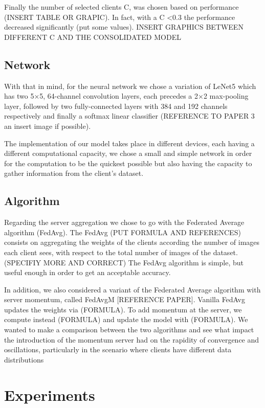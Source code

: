 \documentclass[twocolumn]{article}
\begin{document}
Finally the number of selected clients C, was chosen based on performance (INSERT TABLE OR GRAPIC). In fact, with a C <0.3 the performance decreased significantly (put some values).
INSERT GRAPHICS BETWEEN DIFFERENT C AND THE CONSOLIDATED MODEL

\subsection{Network}

With that in mind, for the neural network we chose a variation of LeNet5 which has two 5×5, 64-channel convolution layers, each precedes a 2×2 max-pooling layer, followed by two fully-connected layers with 384 and 192 channels respectively and finally a softmax linear classifier (REFERENCE TO PAPER 3 an insert image if possible). 

The implementation of our model takes place in different devices, each having a different computational capacity, we chose a small and simple network in order for the computation to be the quickest possible but also having the capacity to gather information from the client's dataset.

\subsection{Algorithm}
Regarding the server aggregation we chose to go with the Federated Average algorithm (FedAvg). The FedAvg (PUT FORMULA AND REFERENCES) consists on aggregating the weights of the clients according the number of images each client sees, with respect to the total number of images of the dataset.(SPECIFIY MORE AND CORRECT)
The FedAvg algorithm is simple, but useful enough in order to get an acceptable accuracy.

In addition, we also considered a variant of the Federated Average algorithm with server momentum, called FedAvgM [REFERENCE PAPER]. Vanilla FedAvg updates the weights via (FORMULA). To add momentum at the server, we compute instead (FORMULA) and update the model with (FORMULA). 
We wanted to make a comparison between the two algorithms and see what impact the introduction of the momentum server had on the rapidity of convergence and oscillations, particularly in the scenario where clients have different data distributions


\section{Experiments} %
\end{document}
